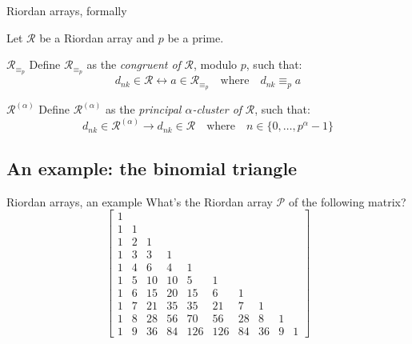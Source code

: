 \documentclass[10pt,serif, professionalfont]{beamer}
\begin{document}
\begin{frame}{Riordan arrays, formally}

    Let $\mathcal{R}$ be a Riordan array and $p$ be a prime.
    
    \begin{block}{$\mathcal{R}_{\equiv_{p}}$}
        Define $\mathcal{R}_{\equiv_{p}}$
        as the \emph{congruent of} $\mathcal{R}$, modulo $p$, such that:
        \begin{displaymath}
            d_{nk}\in\mathcal{R} \leftrightarrow a \in\mathcal{R}_{\equiv_{p}}
            \quad \text{where} \quad d_{nk}\equiv_{p} a
        \end{displaymath}
    \end{block}

    \begin{block}{$\mathcal{R}^{(\alpha)}$}
        Define $\mathcal{R}^{(\alpha)}$
        as the \emph{principal $\alpha$-cluster of} $\mathcal{R}$, such that:
        \begin{displaymath}
            d_{nk}\in\mathcal{R}^{(\alpha)}\rightarrow d_{nk}\in\mathcal{R}
            \quad \text{where}\quad n\in\lbrace0,\ldots,p^{\alpha}-1\rbrace
        \end{displaymath}
    \end{block}
    

\end{frame}

\subsection{An example: the binomial triangle}

\begin{frame}{Riordan arrays, an example}
    What's the Riordan array $\mathcal{P}$ of the following matrix?
    \begin{displaymath} 
        \left[
        \begin{array}{rrrrrrrrrr}
        1 &  &  &  &  &  &  &  &  &  \\
        1 & 1 &  &  &  &  &  &  &  &  \\
        1 & 2 & 1 &  &  &  &  &  &  &  \\
        1 & 3 & 3 & 1 &  &  &  &  &  &  \\
        1 & 4 & 6 & 4 & 1 &  &  &  &  &  \\
        1 & 5 & 10 & 10 & 5 & 1 &  &  &  &  \\
        1 & 6 & 15 & 20 & 15 & 6 & 1 &  &  &  \\
        1 & 7 & 21 & 35 & 35 & 21 & 7 & 1 &  &  \\
        1 & 8 & 28 & 56 & 70 & 56 & 28 & 8 & 1 &  \\
        1 & 9 & 36 & 84 & 126 & 126 & 84 & 36 & 9 & 1
        \end{array}
        \right] 
    \end{displaymath}
\end{frame}
\end{document}
